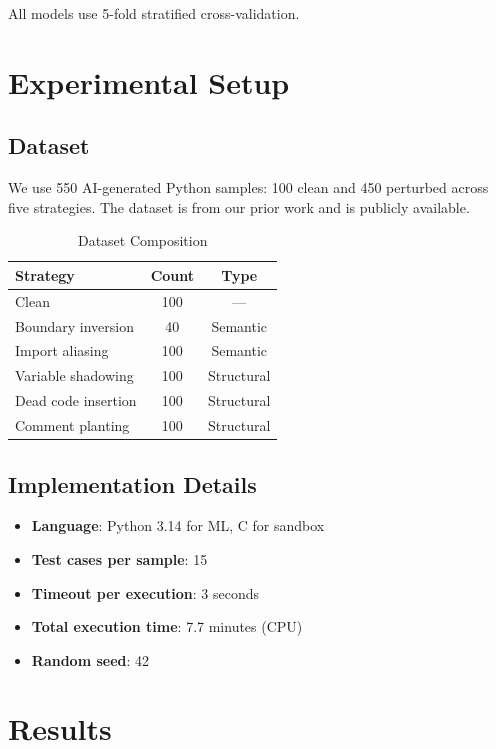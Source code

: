 \documentclass[conference]{IEEEtran}
\begin{document}
All models use 5-fold stratified cross-validation.

\section{Experimental Setup}
\label{sec:setup}

\subsection{Dataset}

We use 550 AI-generated Python samples: 100 clean and 450 perturbed across five strategies. The dataset is from our prior work and is publicly available.

\begin{table}[h]
\centering
\caption{Dataset Composition}
\label{tab:dataset}
\begin{tabular}{@{}lcc@{}}
\toprule
\textbf{Strategy} & \textbf{Count} & \textbf{Type} \\
\midrule
Clean & 100 & --- \\
Boundary inversion & 40 & Semantic \\
Import aliasing & 100 & Semantic \\
Variable shadowing & 100 & Structural \\
Dead code insertion & 100 & Structural \\
Comment planting & 100 & Structural \\
\bottomrule
\end{tabular}
\end{table}

\subsection{Implementation Details}

\begin{itemize}
    \item \textbf{Language}: Python 3.14 for ML, C for sandbox
    \item \textbf{Test cases per sample}: 15
    \item \textbf{Timeout per execution}: 3 seconds
    \item \textbf{Total execution time}: 7.7 minutes (CPU)
    \item \textbf{Random seed}: 42
\end{itemize}

\section{Results}
\label{sec:results}
\end{document}
